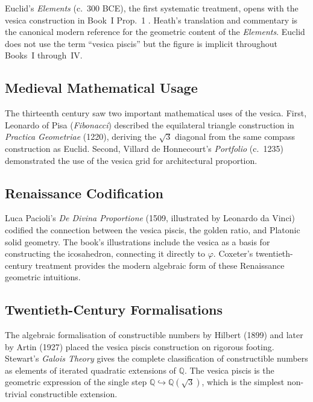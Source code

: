 Euclid's \emph{Elements} (c.~300 BCE), the first systematic treatment,
opens with the vesica construction in Book~I Prop.~1 \cite{euclid_elements}.
Heath's translation and commentary \cite{euclid_elements} is the canonical
modern reference for the geometric content of the \emph{Elements}.
Euclid does not use the term ``vesica piscis'' but the figure is
implicit throughout Books~I through~IV.

\subsection{Medieval Mathematical Usage}
\label{subsec:ch11-medieval}

The thirteenth century saw two important mathematical uses of the vesica.
First, Leonardo of Pisa (\emph{Fibonacci}) described the equilateral
triangle construction in \emph{Practica Geometriae} (1220), deriving
the \(\sqrt{3}\) diagonal from the same compass construction as Euclid.
Second, Villard de Honnecourt's \emph{Portfolio} (c.~1235) demonstrated
the use of the vesica grid for architectural proportion.

\subsection{Renaissance Codification}
\label{subsec:ch11-renaissance}

Luca Pacioli's \emph{De Divina Proportione} (1509, illustrated by Leonardo
da Vinci) codified the connection between the vesica piscis, the golden
ratio, and Platonic solid geometry.
The book's illustrations include the vesica as a basis for constructing
the icosahedron, connecting it directly to \(\varphi\).
Coxeter's twentieth-century treatment \cite{coxeter_regular_polytopes}
provides the modern algebraic form of these Renaissance geometric intuitions.

\subsection{Twentieth-Century Formalisations}
\label{subsec:ch11-20c}

The algebraic formalisation of constructible numbers by Hilbert (1899)
and later by Artin (1927) placed the vesica piscis construction on
rigorous footing.
Stewart's \emph{Galois Theory} \cite{stewart_galois_theory} gives the
complete classification of constructible numbers as elements of
iterated quadratic extensions of \(\mathbb{Q}\).
The vesica piscis is the geometric expression of the single step
\(\mathbb{Q} \hookrightarrow \mathbb{Q}(\sqrt{3})\), which is the
simplest non-trivial constructible extension.

